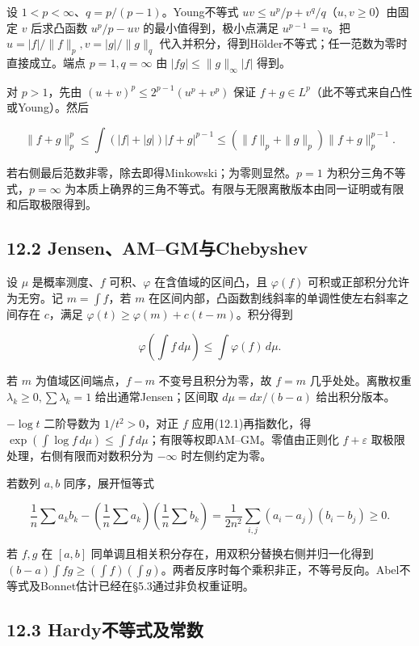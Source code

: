 \documentclass[11pt,a4paper]{article}
\begin{document}
设 \(1<p<\infty\)、\(q=p/(p-1)\)。Young不等式
\(uv\le u^p/p+v^q/q\)（\(u,v\ge0\)）由固定 \(v\) 后求凸函数 \(u^p/p-uv\)
的最小值得到，极小点满足 \(u^{p-1}=v\)。把
\(u=|f|/\|f\|_p,v=|g|/\|g\|_q\)
代入并积分，得到Hölder不等式；任一范数为零时直接成立。端点
\(p=1,q=\infty\) 由 \(|fg|\le\|g\|_\infty|f|\) 得到。

对 \(p>1\)，先由 \((u+v)^p\le2^{p-1}(u^p+v^p)\) 保证
\(f+g\in L^p\)（此不等式来自凸性或Young）。然后

\[
\|f+g\|_p^p\le\int(|f|+|g|)|f+g|^{p-1}
\le(\|f\|_p+\|g\|_p)\|f+g\|_p^{p-1}.
\]

若右侧最后范数非零，除去即得Minkowski；为零则显然。\(p=1\)
为积分三角不等式，\(p=\infty\)
为本质上确界的三角不等式。有限与无限离散版本由同一证明或有限和后取极限得到。

\subsection{12.2
Jensen、AM--GM与Chebyshev}\label{jensenamgmux4e0echebyshev}

设 \(\mu\) 是概率测度、\(f\) 可积、\(\varphi\) 在含值域的区间凸，且
\(\varphi(f)\) 可积或正部积分允许为无穷。记 \(m=\int f\)，若 \(m\)
在区间内部，凸函数割线斜率的单调性使左右斜率之间存在 \(c\)，满足
\(\varphi(t)\ge\varphi(m)+c(t-m)\)。积分得到

\[
\varphi(\int f\,d\mu)\le\int\varphi(f)\,d\mu.\tag{12.1}
\]

若 \(m\) 为值域区间端点，\(f-m\) 不变号且积分为零，故 \(f=m\)
几乎处处。离散权重 \(\lambda_k\ge0,\sum\lambda_k=1\)
给出通常Jensen；区间取 \(d\mu=dx/(b-a)\) 给出积分版本。

\(-\log t\) 二阶导数为 \(1/t^2>0\)，对正 \(f\) 应用(12.1)再指数化，得
\(\exp(\int\log f\,d\mu)\le\int f\,d\mu\)；有限等权即AM--GM。零值由正则化
\(f+\varepsilon\) 取极限处理，右侧有限而对数积分为 \(-\infty\)
时左侧约定为零。

若数列 \(a,b\) 同序，展开恒等式

\[
\frac1n\sum a_kb_k-\left(\frac1n\sum a_k\right)\left(\frac1n\sum b_k\right)
=\frac1{2n^2}\sum_{i,j}(a_i-a_j)(b_i-b_j)\ge0.
\]

若 \(f,g\) 在 \([a,b]\)
同单调且相关积分存在，用双积分替换右侧并归一化得到
\((b-a)\int fg\ge(\int f)(\int g)\)。两者反序时每个乘积非正，不等号反向。Abel不等式及Bonnet估计已经在§5.3通过非负权重证明。

\subsection{12.3
Hardy不等式及常数}\label{hardyux4e0dux7b49ux5f0fux53caux5e38ux6570}
\end{document}
